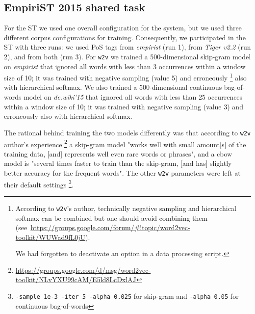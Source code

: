 \documentclass[11pt]{article}
\newcommand\wtv{\texttt{w2v}\xspace}
\begin{document}
%
%


\subsection{EmpiriST 2015 shared task} %
\label{ssec:case_empirist}

For the ST we used one overall configuration for the system, but we used three
different corpus configurations for training.
Consequently, we participated in the ST with three runs:
we used PoS tags from \emph{empirist} (run 1), from \emph{Tiger v2.2} (run 2),
and from both (run 3).  
For \wtv we trained a 500-dimensional skip-gram model on \emph{empirist} that
ignored all words with less than 3 occurrences within a window size of 10;
it was trained with negative sampling (value 5) and erroneously%
\footnote{%
    According to \wtv's author, technically negative sampling and
    hierarchical softmax can be combined but one should avoid combining them~%
    (see~\url{https://groups.google.com/forum/\#!topic/word2vec-toolkit/WUWad9fL0jU}).
    
    We had forgotten to deactivate an option in a data processing script.
}
also with hierarchical softmax.
We also trained a 500-dimensional continuous bag-of-words model on
\emph{de.wiki'15} that ignored all words with less than 25 occurrences within a
window size of 10; it was trained with negative sampling (value 3) and
erroneously also with hierarchical softmax.

The rational behind training the two models differently was that according to
\wtv author's experience%
\footnote{\url{https://groups.google.com/d/msg/word2vec-toolkit/NLvYXU99cAM/E5ld8LcDxlAJ}}
a skip-gram model "works well with small amount[s] of the training data, [and]
represents well even rare words or phrases", and a cbow model is "several times
faster to train than the skip-gram, [and has] slightly better accuracy for the
frequent words".
The other \wtv parameters were left at their default settings%
\footnote{\texttt{-sample 1e-3 -iter 5 -alpha 0.025} for skip-gram and
\texttt{-alpha 0.05} for continuous bag-of-words}.
\end{document}
